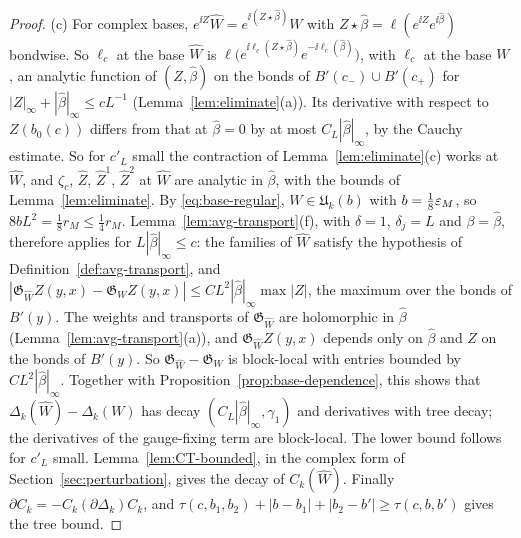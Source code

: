 \begin{proof}
(c) For complex bases, $e^{\ii Z}\hat W=e^{\ii(Z\star\hat\beta)}W$ with $Z\star\hat\beta=\ell(e^{\ii Z}e^{\ii\hat\beta})$ bondwise. So $\ell_c$ at the base $\hat W$ is $\ell\big(e^{\ii\ell_c(Z\star\hat\beta)}e^{-\ii\ell_c(\hat\beta)}\big)$, with $\ell_c$ at the base $W$, an analytic function of $(Z,\hat\beta)$ on the bonds of $B'(c_-)\cup B'(c_+)$ for $|Z|_\infty+|\hat\beta|_\infty\le cL^{-1}$ (Lemma~\ref{lem:eliminate}(a)). Its derivative with respect to $Z(b_0(c))$ differs from that at $\hat\beta=0$ by at most $C_L|\hat\beta|_\infty$, by the Cauchy estimate. So for $c'_L$ small the contraction of Lemma~\ref{lem:eliminate}(c) works at $\hat W$, and $\zeta_c$, $\hat Z$, $\hat Z^1$, $\hat Z^2$ at $\hat W$ are analytic in $\hat\beta$, with the bounds of Lemma~\ref{lem:eliminate}. By \eqref{eq:base-regular}, $W\in\mathfrak U_k(b)$ with $b=\frac18\varepsilon_M$, so $8bL^2=\frac18r_M\le\frac14r_M$. Lemma~\ref{lem:avg-transport}(f), with $\delta=1$, $\delta_j=L$ and $\beta=\hat\beta$, therefore applies for $L|\hat\beta|_\infty\le c$: the families of $\hat W$ satisfy the hypothesis of Definition~\ref{def:avg-transport}, and $|\mathfrak G_{\hat W}Z(y,x)-\mathfrak G_WZ(y,x)|\le CL^2|\hat\beta|_\infty\max|Z|$, the maximum over the bonds of $B'(y)$. The weights and transports of $\mathfrak G_{\hat W}$ are holomorphic in $\hat\beta$ (Lemma~\ref{lem:avg-transport}(a)), and $\mathfrak G_{\hat W}Z(y,x)$ depends only on $\hat\beta$ and $Z$ on the bonds of $B'(y)$. So $\mathfrak G_{\hat W}-\mathfrak G_W$ is block-local with entries bounded by $CL^2|\hat\beta|_\infty$. Together with Proposition~\ref{prop:base-dependence}, this shows that $\Delta_k(\hat W)-\Delta_k(W)$ has decay $(C_L|\hat\beta|_\infty,\gamma_1)$ and derivatives with tree decay; the derivatives of the gauge-fixing term are block-local. The lower bound follows for $c'_L$ small. Lemma~\ref{lem:CT-bounded}, in the complex form of Section~\ref{sec:perturbation}, gives the decay of $C_k(\hat W)$. Finally $\partial C_k=-C_k(\partial\Delta_k)C_k$, and $\tau(c,b_1,b_2)+|b-b_1|+|b_2-b'|\ge\tau(c,b,b')$ gives the tree bound.
\end{proof}

